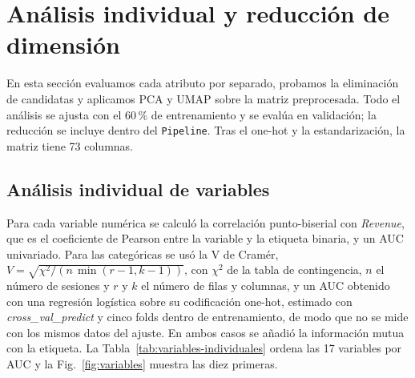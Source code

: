 \documentclass[journal]{IEEEtran}
\begin{document}
\section{Análisis individual y reducción de dimensión}
\label{sec:reduccion}

En esta sección evaluamos cada atributo por separado, probamos la eliminación de candidatas y
aplicamos PCA y UMAP sobre la matriz preprocesada. Todo el análisis se ajusta con el 60\,\% de
entrenamiento y se evalúa en validación; la reducción se incluye dentro del
\texttt{Pipeline}. Tras el one-hot y la estandarización, la matriz tiene 73 columnas.

\subsection{Análisis individual de variables}

Para cada variable numérica se calculó la correlación punto-biserial con \textit{Revenue},
que es el coeficiente de Pearson entre la variable y la etiqueta binaria, y un AUC
univariado. Para las categóricas se usó la V de Cramér,
$V=\sqrt{\chi^2/(n\,\min(r-1,k-1))}$, con $\chi^2$ de la tabla de contingencia, $n$ el
número de sesiones y $r$ y $k$ el número de filas y columnas, y un AUC obtenido con una
regresión logística sobre su codificación one-hot, estimado con \textit{cross\_val\_predict}
y cinco folds dentro de entrenamiento, de modo que no se mide con los mismos datos del ajuste. En ambos
casos se añadió la información mutua con la etiqueta. La
Tabla~\ref{tab:variables-individuales} ordena las 17 variables por AUC y la
Fig.~\ref{fig:variables} muestra las diez primeras.
\end{document}
